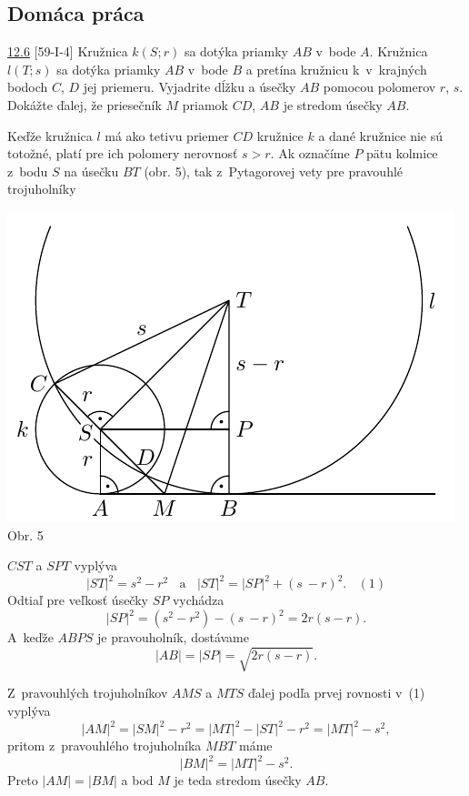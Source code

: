 \subsection*{Domáca práca}
\begin{tcolorbox}[breakable,notitle,boxrule=0pt,colback=light-gray,colframe=light-gray]\ul{12.6} [59-I-4] Kružnica $k(S; r)$ sa dotýka priamky $AB$ v~bode $A$. Kružnica $l(T; s)$ sa dotýka priamky $AB$ v~bode $B$ a pretína kružnicu k~v~krajných bodoch $C$, $D$ jej priemeru. Vyjadrite dĺžku a úsečky $AB$ pomocou polomerov $r$, $s$. Dokážte ďalej, že priesečník $M$ priamok $CD$, $AB$ je stredom úsečky $AB$.

\end{tcolorbox}

\rieh Keďže kružnica $l$ má ako tetivu priemer $CD$ kružnice $k$ a dané kružnice nie sú totožné, platí pre ich polomery nerovnosť $s > r$. Ak označíme $P$ pätu kolmice z~bodu $S$ na úsečku $BT$ (obr. 5), tak z~Pytagorovej vety pre pravouhlé trojuholníky
\begin{center}
\includegraphics{obrazky/59D4}\\

Obr. 5
\end{center}
$CST$ a $SPT$ vyplýva
$$|ST|^2 = s^2 - r^2\ \ \ \ \text{a} \ \ \ \  |ST|^2 = |SP|^2 + (s~-r)^2. \ \ \ \  (1)$$
Odtiaľ pre veľkosť úsečky $SP$ vychádza
$$|SP|^2 = (s^2 - r^2 ) - (s~- r)^2 = 2r(s - r).$$
A~keďže $ABPS$ je pravouholník, dostávame
$$|AB| = |SP| =\sqrt{2r(s - r)}.$$

Z~pravouhlých trojuholníkov $AMS$ a $MTS$ ďalej podľa prvej rovnosti v~(1) vyplýva
$$|AM|^2 = |SM|^2 - r^2 = |MT|^2- |ST|^2 - r^2 = |MT|^2 -s^2,$$
pritom z~pravouhlého trojuholníka $MBT$ máme
$$|BM|^2 = |MT|^2 - s^2.$$
Preto $|AM| = |BM|$ a bod $M$ je teda stredom úsečky $AB$.

